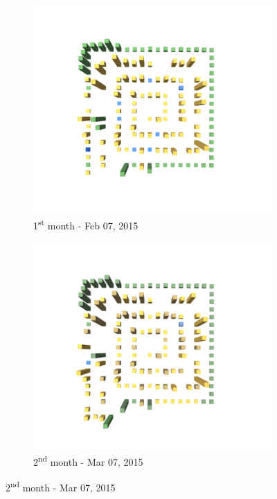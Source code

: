 \begin{figure}[ht]
    \begin{subfigure}{0.48\textwidth}
    \includegraphics[width=\linewidth]{JetUML_V1S1.png}
    \caption{1\textsuperscript{st} month - Feb 07, 2015 } \label{fig:JetUML_V1S1}
    \end{subfigure}\hspace*{\fill}
    \begin{subfigure}{0.48\textwidth}
        \includegraphics[width=\linewidth]{JetUML_V1S2.png}
        \caption{2\textsuperscript{nd} month - Mar 07, 2015} \label{fig:JetUML_V1S2}
    \end{subfigure}
    

\end{figure}
